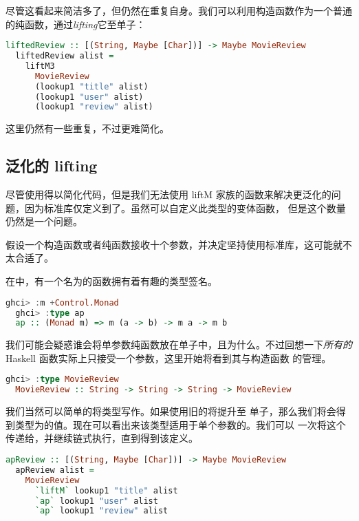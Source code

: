 \documentclass[./main.tex]{subfiles}
\begin{document}
尽管这看起来简洁多了，但仍然在重复自身。我们可以利用构造函数作为一个普通的纯函数，通过\textit{lifting}它至单子：

\begin{lstlisting}[language=Haskell]
  liftedReview :: [(String, Maybe [Char])] -> Maybe MovieReview
  liftedReview alist =
    liftM3
      MovieReview
      (lookup1 "title" alist)
      (lookup1 "user" alist)
      (lookup1 "review" alist)
\end{lstlisting}

这里仍然有一些重复，不过更难简化。

\subsection*{泛化的 lifting}

尽管使用得以简化代码，但是我们无法使用 liftM 家族的函数来解决更泛化的问题，因为标准库仅定义到了。虽然可以自定义此类型的变体函数，
但是这个数量仍然是一个问题。

假设一个构造函数或者纯函数接收十个参数，并决定坚持使用标准库，这可能就不太合适了。

在中，有一个名为的函数拥有着有趣的类型签名。

\begin{lstlisting}[language=Haskell]
  ghci> :m +Control.Monad
  ghci> :type ap
  ap :: (Monad m) => m (a -> b) -> m a -> m b
\end{lstlisting}

我们可能会疑惑谁会将单参数纯函数放在单子中，且为什么。不过回想一下\textit{所有的} Haskell 函数实际上只接受一个参数，这里开始将看到其与构造函数
的管理。

\begin{lstlisting}[language=Haskell]
  ghci> :type MovieReview
  MovieReview :: String -> String -> String -> MovieReview
\end{lstlisting}

我们当然可以简单的将类型写作。如果使用旧的将提升至
单子，那么我们将会得到类型为的值。现在可以看出来该类型适用于单个参数的。我们可以
一次将这个传递给，并继续链式执行，直到得到该定义。

\begin{lstlisting}[language=Haskell]
  apReview :: [(String, Maybe [Char])] -> Maybe MovieReview
  apReview alist =
    MovieReview
      `liftM` lookup1 "title" alist
      `ap` lookup1 "user" alist
      `ap` lookup1 "review" alist
\end{lstlisting}
\end{document}
